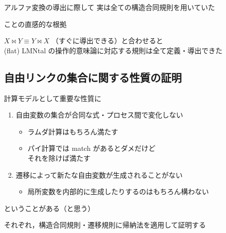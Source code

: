 \begin{frame}{アルファ変換の導出に際して}
  実は全ての構造合同規則を用いていた
  \begin{itemize}
    \thusitem
     ことの直感的な根拠
  \end{itemize}

  \vspace{2em}
  
  $X \bowtie Y \equiv Y \bowtie X$ （すぐに導出できる）と合わせると\\
  (flat) LMNtal の操作的意味論に対応する規則は全て定義・導出できた

\end{frame}

\subsection{自由リンクの集合に関する性質の証明}

\begin{frame}{}
  計算モデルとして重要な性質に
  \begin{enumerate}
  \item 自由変数の集合が合同な式・プロセス間で変化しない
    \begin{itemize}
    \item
      ラムダ計算はもちろん満たす
    \item
      パイ計算では match があるとダメだけど\\
      それを除けば満たす
    \end{itemize}
  \item 遷移によって新たな自由変数が生成されることがない
    \begin{itemize}
    \item 局所変数を内部的に生成したりするのはもちろん構わない
    \end{itemize}
  \end{enumerate}
  ということがある（と思う）

  \vspace{2em}

  それぞれ，構造合同規則・遷移規則に帰納法を適用して証明する
\end{frame}


